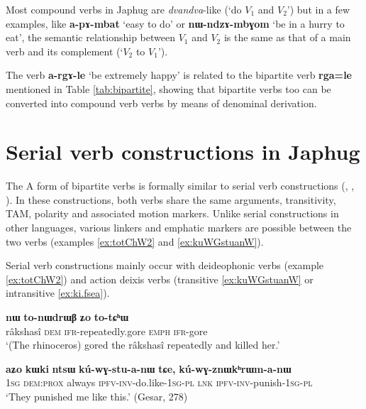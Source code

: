 \documentclass[11pt]{article}
\newcommand{\ipa}[1]{{\phon\textbf{#1}}}
\newcommand{\jpg}[2]{\ipa{#1} `#2'}
\begin{document}
Most compound verbs in Japhug are \textit{dvandva}-like (`do $V_1$ and $V_2$')  but in a few examples, like \jpg{a-pɤ-mbat}{easy to do} or \jpg{nɯ-ndzɤ-mbɣom}{be in a hurry to eat}, the semantic relationship between $V_1$  and $V_2$ is the same as that of a main verb and its complement (`$V_2$ to $V_1$').

The verb \jpg{a-rgɤ-le}{be extremely happy} is related to the bipartite verb \ipa{rga=le} mentioned in Table \ref{tab:bipartite}, showing that bipartite verbs too can be converted into compound verb verbs by means of denominal derivation.

\section{Serial verb constructions in Japhug} \label{sec:serial}
The A form of bipartite verbs is formally similar to serial verb constructions (\citealt{sun12complementation}, \citealt{jacques13harmonization}, \citealt{jacques16complementation}). In these constructions, both verbs share the same arguments, transitivity, TAM, polarity and associated motion markers. Unlike serial constructions in other languages, various linkers and emphatic markers are possible between the two verbs (examples \ref{ex:totChW2} and \ref{ex:kuWGstuanW}).

Serial verb constructions mainly occur with deideophonic verbs (example \ref{ex:totChW2}) and action deixis verbs (transitive \ref{ex:kuWGstuanW} or intransitive \ref{ex:ki.fsea}).

\begin{exe}
\ex \label{ex:totChW2}
\gll 	\ipa{srɯnmɯ} 	\ipa{nɯ} 	\ipa{to-nɯdrɯβ} 	\ipa{ʑo} 	 	\ipa{to-tɕʰɯ} \\
 râkshasî \textsc{dem}  \textsc{ifr}-repeatedly.gore  \textsc{emph}  \textsc{ifr}-gore \\
 \glt `(The rhinoceros) gored the râkshasî repeatedly and killed her.' 
\end{exe}	

\begin{exe}
\ex \label{ex:kuWGstuanW}
\gll 	
 \ipa{aʑo} 	\ipa{kɯki} 	\ipa{ntsɯ} 	\ipa{kú-wɣ-stu-a-nɯ} 	\ipa{tɕe,} 	\ipa{kú-wɣ-znɯkʰrɯm-a-nɯ} \\
 \textsc{1sg} \textsc{dem:prox} always \textsc{ipfv-inv}-do.like-\textsc{1sg-pl} \textsc{lnk} \textsc{ipfv-inv}-punish-\textsc{1sg-pl} \\
 \glt `They punished me like this.' (Gesar, 278)
\end{exe}	
\end{document}
